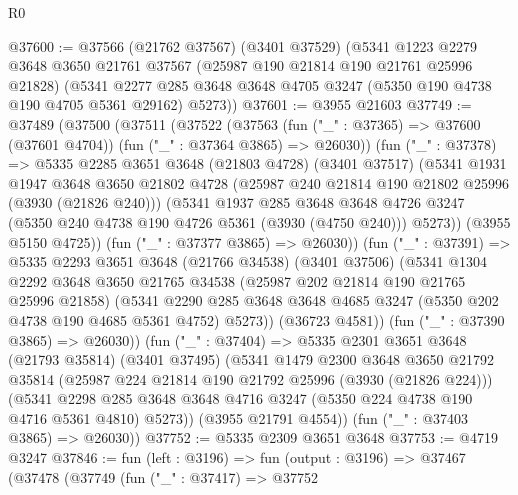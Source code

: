 \begin{lexlean}{R0}
\begin{coremodule}
@37600 := @37566
    (@21762 @37567)
    (@3401 @37529)
    (@5341
      @1223
      @2279
      @3648
      @3650
      @21761
      @37567
      (@25987 @190 @21814 @190 @21761 @25996 @21828)
      (@5341 @2277 @285 @3648 @3648 @4705 @3247 (@5350 @190 @4738 @190 @4705 @5361 @29162) @5273))
@37601 := @3955 @21603
@37749 := @37489
    (@37500
      (@37511
        (@37522
          (@37563
            (fun ("_" : @37365) => @37600 (@37601 @4704))
            (fun ("_" : @37364 @3865) => @26030))
          (fun ("_" : @37378) =>
          @5335
            @2285
            @3651
            @3648
            (@21803 @4728)
            (@3401 @37517)
            (@5341
              @1931
              @1947
              @3648
              @3650
              @21802
              @4728
              (@25987 @240 @21814 @190 @21802 @25996 (@3930 (@21826 @240)))
              (@5341
                @1937
                @285
                @3648
                @3648
                @4726
                @3247
                (@5350 @240 @4738 @190 @4726 @5361 (@3930 (@4750 @240)))
                @5273))
            (@3955 @5150 @4725))
          (fun ("_" : @37377 @3865) => @26030))
        (fun ("_" : @37391) =>
        @5335
          @2293
          @3651
          @3648
          (@21766 @34538)
          (@3401 @37506)
          (@5341
            @1304
            @2292
            @3648
            @3650
            @21765
            @34538
            (@25987 @202 @21814 @190 @21765 @25996 @21858)
            (@5341
              @2290
              @285
              @3648
              @3648
              @4685
              @3247
              (@5350 @202 @4738 @190 @4685 @5361 @4752)
              @5273))
          (@36723 @4581))
        (fun ("_" : @37390 @3865) => @26030))
      (fun ("_" : @37404) =>
      @5335
        @2301
        @3651
        @3648
        (@21793 @35814)
        (@3401 @37495)
        (@5341
          @1479
          @2300
          @3648
          @3650
          @21792
          @35814
          (@25987 @224 @21814 @190 @21792 @25996 (@3930 (@21826 @224)))
          (@5341
            @2298
            @285
            @3648
            @3648
            @4716
            @3247
            (@5350 @224 @4738 @190 @4716 @5361 @4810)
            @5273))
        (@3955 @21791 @4554))
      (fun ("_" : @37403 @3865) => @26030))
@37752 := @5335 @2309 @3651 @3648
@37753 := @4719 @3247
@37846 := fun (left : @3196) =>
  fun (output : @3196) =>
  @37467
    (@37478
      (@37749
        (fun ("_" : @37417) =>
        @37752

\end{coremodule}
\end{lexlean}
